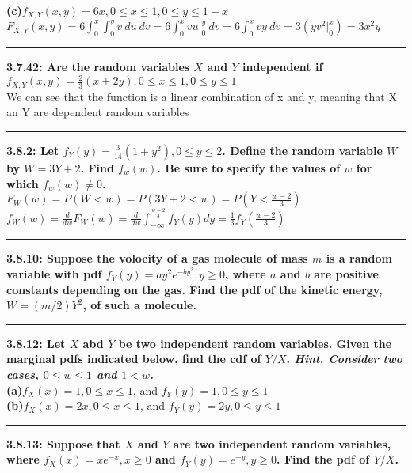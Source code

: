 \documentclass[11pt]{article}
\newcommand\question[2]{\vspace{.25in}\hrule\textbf{#1: #2}\vspace{.5em}\vspace{.10in}}
\renewcommand\part[1]{\vspace{.10in}\textbf{(#1)}}
\begin{document}
\part{c}{$f_{X,Y}(x,y) = 6x,0 \leq x \leq 1,0 \leq y \leq 1-x$}
\\
$
F_{X,Y}(x,y)
=
6 \int_{0}^{x} \int_{0}^{y} v \ du \ dv
=
6 \int_{0}^{x} vu \big |_{0}^{y}  \ dv
=
6 \int_{0}^{x} vy \ dv
=
3 (y v^{2} \big |_{0}^{x})
=
3x^{2}y
$


\question{3.7.42}
{Are the random variables $X$ and $Y$ independent if
$f_{X,Y}(x,y) = \frac{2}{3}(x+2y),0 \leq x \leq 1,0 \leq y \leq 1$
}
\\
We can see that the function is a linear combination of x and y, meaning that X an Y are dependent random variables

\question{3.8.2}
{Let $f_{Y}(y) = \frac{3}{14}(1+y^{2}),0 \leq y \leq 2$. Define the random
variable $W$ by $W=3Y + 2$. Find $f_{w}(w)$. Be sure to specify the values
of $w$ for which $f_{w}(w) \neq  0$.}
\\
$
F_{W}(w)
=
P(W < w)
=
P(3Y+2 < w)
=
P(Y < \frac{w-2}{3})
$
\\
$
f_{W}(w)
=
\frac{d}{dw}F_{W}(w)
=
\frac{d}{dw} \int_{- \infty}^{\frac{w-2}{3}} f_{Y}(y) dy
=
\frac{1}{3} f_{Y}(\frac{w-2}{3})
$


\question{3.8.10}
{Suppose the volocity of a gas molecule of mass $m$ is a random variable with
pdf $f_{Y}(y) = ay^{2}e^{-by^{2}},y \geq 0$, where $a$ and $b$ are positive
constants depending on the gas. Find the pdf of the kinetic energy, 
$W =(m/2)Y^{2}$, of such a molecule.}


\question{3.8.12}
{Let $X$ abd $Y$ be two independent random variables. Given the marginal pdfs
indicated below, find the cdf of $Y/X$. \emph{Hint. Consider two cases,
$0 \leq w \leq 1$ and $1 < w$.}}
\\
\part{a}{$f_{X}(x)=1,0 \leq x \leq 1$, and $f_{Y}(y)=1,0 \leq y \leq 1$}
\\
\part{b}{$f_{X}(x)=2x,0 \leq x \leq 1$, and $f_{Y}(y)=2y,0 \leq y \leq 1$}
\\


\question{3.8.13}
{Suppose that $X$ and $Y$ are two independent random variables, where 
$f_{X}(x) =xe^{-x},x \geq 0$ and $f_{Y}(y) = e^{-y},y \geq 0$. Find the pdf of
$Y/X$.}
\end{document}
